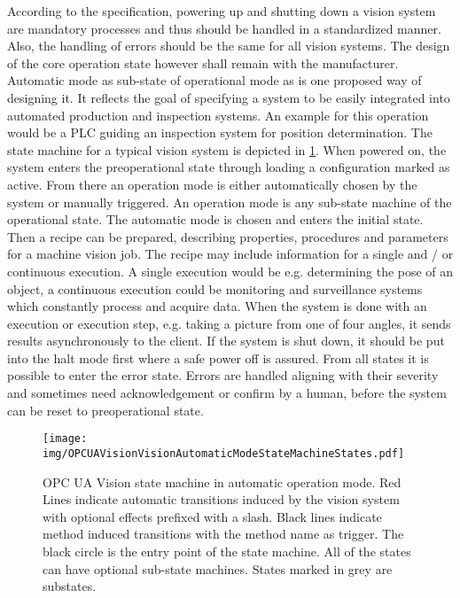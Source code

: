 According to the specification, powering up and shutting down a vision system are mandatory processes and thus should be handled in a standardized manner. Also, the handling of errors should be the same for all vision systems. The design of the core operation state however shall remain with the manufacturer. Automatic mode as sub-state of operational mode as   is one proposed way of designing it. It reflects the goal of specifying a system to be easily integrated into automated production and inspection systems. An example for this operation would be a PLC guiding an inspection system for position determination. The state machine for a typical vision system is depicted in \ref{fig:OPCStateMachineAutomatic}. When powered on, the system enters the preoperational state through loading a configuration marked as active. From there an operation mode is either automatically chosen by the system or manually triggered. An operation mode is any sub-state machine of the operational state. The automatic mode is chosen and enters the initial state. Then a recipe can be prepared, describing properties, procedures and parameters for a machine vision job. The recipe may include information for a single and / or continuous execution. A single execution would be e.g. determining the pose of an object, a continuous execution could be monitoring and surveillance systems which constantly process and acquire data. When the system is done with an execution or execution step, e.g. taking a picture from one of four angles, it sends results asynchronously to the client. If the system is shut down, it should be put into the halt mode first where a safe power off is assured. From all states it is possible to enter the error state. Errors are handled aligning with their severity and sometimes need acknowledgement or confirm by a human, before the system can be reset to preoperational state.

\begin{figure}[ht]
    \centering
    \texttt{[image: img/OPCUAVisionVisionAutomaticModeStateMachineStates.pdf]}
    \caption[OPC UA Vision state machine in automatic operation mode]{OPC UA Vision state machine in automatic operation mode. Red Lines indicate automatic transitions induced by the vision system with optional effects prefixed with a slash. Black lines indicate method induced transitions with the method name as trigger. The black circle is the entry point of the state machine. All of the states can have optional sub-state machines. States marked in grey are substates.\cite{VDMA2018OPCSpecification}}
    \label{fig:OPCStateMachineAutomatic}
\end{figure}

